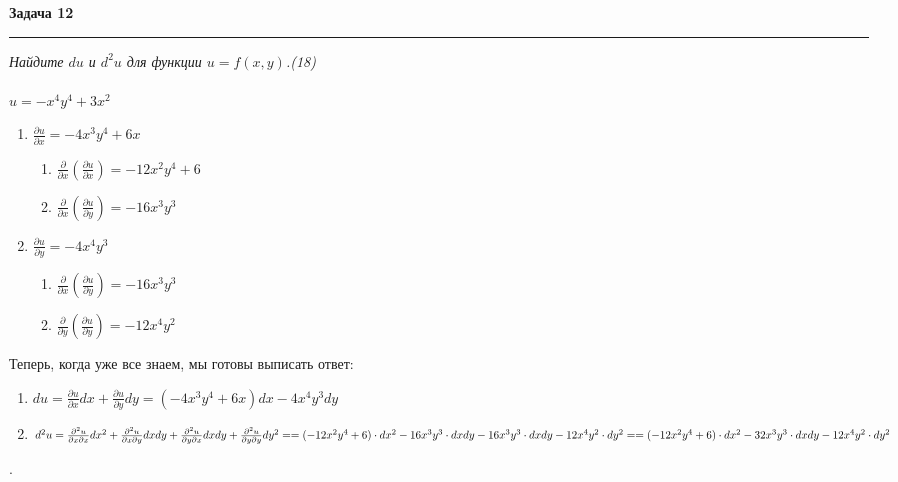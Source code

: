 \documentclass[a4paper,11pt]{article}
\begin{document}
\textbf{\large Задача 12}
\medskip\hrule\medskip
\textit{Найдите $ du $ и $ d^2u $ для функции $ u = f(x, y) $.(18)} \\ \\
$ u = -x^4y^4 + 3x^2 $
\begin{enumerate}
	\item $ \frac{\partial u}{\partial x} = -4x^3y^4 + 6x $
	\begin{enumerate}
		\item $ \frac{\partial }{\partial x} (\frac{\partial u}{\partial x}) = -12x^2y^4 + 6 $
		
		\item $ \frac{\partial }{\partial x} (\frac{\partial u}{\partial y}) = -16x^3y^3 $
	\end{enumerate}
	
	\item $ \frac{\partial u}{\partial y} = -4x^4y^3 $
	\begin{enumerate}
		\item $ \frac{\partial }{\partial x} (\frac{\partial u}{\partial y}) = -16x^3y^3 $
		
		\item $ \frac{\partial }{\partial y} (\frac{\partial u}{\partial y}) = -12x^4y^2 $
	\end{enumerate}
\end{enumerate}
Теперь, когда уже все знаем, мы готовы выписать ответ:
\begin{enumerate}
	\item $ du = \frac{\partial u}{\partial x}dx + \frac{\partial u}{\partial y}dy = 
	(-4x^3y^4 + 6x)dx - 4x^4y^3dy
	$
	
	\item $ d^2 u = \frac{\partial^2 u}{\partial x \partial x} dx^2 + 
	\frac{\partial^2 u}{\partial x \partial y} dx dy + 
	\frac{\partial^2 u}{\partial y \partial x} dx dy +
	\frac{\partial^2 u}{\partial y \partial y} dy^2 = \\[4pt] = 
	(-12x^2y^4 + 6)\cdot dx^2 - 16x^3y^3 \cdot dxdy - 16x^3y^3 \cdot dxdy - 12x^4y^2 \cdot dy^2 = \\[4pt] = 
	(-12x^2y^4 + 6)\cdot dx^2 - 32x^3y^3 \cdot dxdy - 12x^4y^2 \cdot dy^2 
	$
\end{enumerate}
. \\ \\ \\
\end{document}
